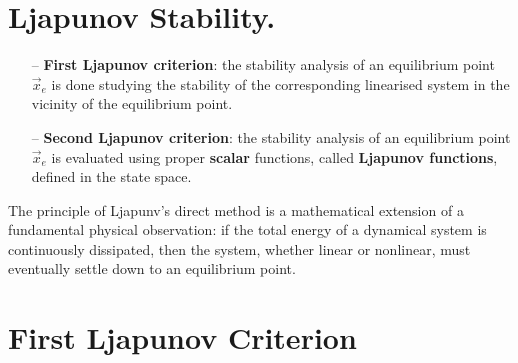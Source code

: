 \documentclass[11pt,a4paper,oneside]{book}
\numberwithin{equation}{section}
\theoremstyle{it}
\theoremstyle{definition}
\begin{document}
\section{Ljapunov Stability.} 
\begin{itemize}
	\item[--] \textbf{First Ljapunov criterion}: the stability analysis of an equilibrium 
	point $\vec{x}_e$ is done studying the stability of the corresponding 
	linearised system in the vicinity of the equilibrium point.
	\item[--] \textbf{Second Ljapunov criterion}: the stability analysis of an equilibrium 
	point $\vec{x}_e$ is evaluated using proper \textbf{scalar} functions, called 
	\textbf{Ljapunov functions}, defined in the state space. 
\end{itemize}
The principle of 
Ljapunv's direct method is a mathematical extension of a fundamental physical 
observation: if the total energy of a dynamical system is continuously 
dissipated, then the system, whether linear or nonlinear, must eventually 
settle down to an equilibrium point. 

\section{First Ljapunov Criterion}
\end{document}
